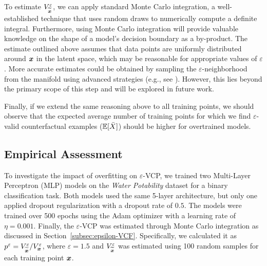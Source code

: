 
To estimate $V_{\widetilde{\boldsymbol{x}}}^{\varepsilon}$, we can apply standard Monte Carlo integration, a well-established technique that uses random draws to numerically compute a definite integral.
Furthermore, using Monte Carlo integration will provide valuable knowledge on the shape of a model's decision boundary as a by-product. 
The estimate outlined above assumes that data points are uniformly distributed around $\boldsymbol{x}$ in the latent space, which may be reasonable for appropriate values of $\varepsilon$.
More accurate estimates could be obtained by sampling the $\varepsilon$-neighborhood from the manifold using advanced strategies (e.g., see \citet{chen2022cikm}). However, this lies beyond the primary scope of this step and will be explored in future work.

Finally, if we extend the same reasoning above to all training points, we should observe that the expected average number of training points for which we find $\varepsilon$-valid counterfactual examples ($\mathbb{E}[\bar{X}]$) should be higher for overtrained models.

\subsection{Empirical Assessment}
To investigate the impact of overfitting on $\varepsilon$-VCP, we trained two Multi-Layer Perceptron (MLP) models on the \textit{Water Potability} dataset \cite{kadiwal2020waterpotability} for a binary classification task. Both models used the same 5-layer architecture, but only one applied dropout regularization with a dropout rate of $0.5$. The models were trained over 500 epochs using the Adam optimizer with a learning rate of $\eta = 0.001$. Finally, the $\varepsilon$-VCP was estimated through Monte Carlo integration as discussed in Section~\ref{subsec:epsilon-VCF}. Specifically, we calculated it as $p^{\varepsilon} = V_{\widetilde{\boldsymbol{x}}}^{\varepsilon}/V_{\boldsymbol{x}}^{\varepsilon}$, where $\varepsilon = 1.5$ and $V_{\widetilde{\boldsymbol{x}}}^{\varepsilon}$ was estimated using 100 random samples for each training point $\boldsymbol{x}$.

